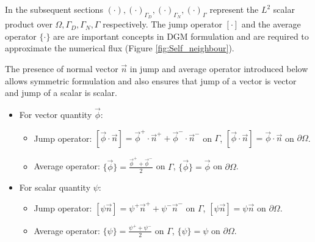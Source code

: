 \documentclass[graybox]{svmult}
\begin{document}
In the subsequent sections $\left( \cdot \right),\left( \cdot \right)_{\Gamma_D},\left( \cdot \right)_{\Gamma_N},\left( \cdot \right)_{\Gamma}$ represent the $L^2$ scalar product over $\Omega,\Gamma_D,\Gamma_N,\Gamma$ respectively. The jump operator $\left[ \cdot \right]$ and the average operator $\lbrace \cdot \rbrace$ are are important concepts in DGM formulation and are required to approximate the numerical flux (Figure \ref{fig:Self_neighbour}).

The presence of normal vector $\overrightarrow{n}$ in jump and average operator introduced below allows symmetric formulation and also ensures that jump of a vector is vector and jump of a scalar is scalar.

\begin{itemize}
\item For vector quantity $\overrightarrow{\phi}$:
\begin{itemize}
\item Jump operator: 
$\left[\overrightarrow{\phi} \cdot \overrightarrow{n}\right] = \overrightarrow{\phi}^+ \cdot \overrightarrow{n}^+ + \overrightarrow{\phi}^- \cdot \overrightarrow{n}^-$ on $\Gamma$, $\left[\overrightarrow{\phi} \cdot \overrightarrow{n}\right] = \overrightarrow{\phi} \cdot \overrightarrow{n}$ on $\partial \Omega$.
\item Average operator:
$\lbrace \overrightarrow{\phi} \rbrace = \frac{\overrightarrow{\phi}^+ + \overrightarrow{\phi}^-}{2}$ on $\Gamma$, $\lbrace \overrightarrow{\phi} \rbrace = \overrightarrow{\phi}$ on $\partial \Omega$.
\end{itemize}
\item For scalar quantity $\psi$:
\begin{itemize}
\item Jump operator:
$\left[\psi \overrightarrow{n} \right] = \psi^+ \overrightarrow{n}^+ + \psi^- \overrightarrow{n}^-$ on $\Gamma$, $\left[\psi \overrightarrow{n} \right] = \psi \overrightarrow{n}$ on $\partial \Omega$.
\item Average operator:
$\lbrace \psi \rbrace = \frac{\psi^+ + \psi^-}{2}$ on $\Gamma$, $\lbrace \psi \rbrace = \psi$ on $\partial \Omega$. 
\end{itemize}
\end{itemize}
\end{document}
